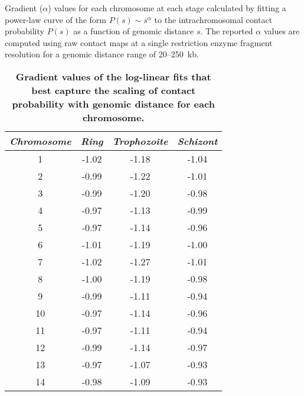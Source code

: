 \documentclass{article}
\begin{document}
\begin{table}
\caption{{\bf Gradient values of the log-linear fits that best capture the scaling of
    contact probability with genomic distance for each chromosome.}}
{ Gradient ($\alpha$) values for each chromosome at each stage calculated by fitting
    a power-law curve of the form $P(s) \sim s^\alpha$ to the intrachromosomal contact
    probability $P(s)$ as a function of genomic distance $s$. The reported $\alpha$
    values are computed using raw contact maps at a single restriction enzyme fragment
    resolution for a genomic distance range of 20--250~kb.
}
\vspace{10pt}
\begin{center}
\begin{tabular}{cccc}
\hline
\emph{Chromosome} & \emph{Ring} & \emph{Trophozoite} & \emph{Schizont} \\
\hline
1 & -1.02 & -1.18 & -1.04 \\
2 & -0.99 & -1.22 & -1.01 \\
3 & -0.99 & -1.20 & -0.98 \\
4 & -0.97 & -1.13 & -0.99 \\
5 & -0.97 & -1.14 & -0.96 \\
6 & -1.01 & -1.19 & -1.00 \\
7 & -1.02 & -1.27 & -1.01 \\
8 & -1.00 & -1.19 & -0.98 \\
9 & -0.99 & -1.11 & -0.94 \\
10 & -0.97 & -1.14 & -0.96 \\
11 & -0.97 & -1.11 & -0.94 \\
12 & -0.99 & -1.14 & -0.97 \\
13 & -0.97 & -1.07 & -0.93 \\
14 & -0.98 & -1.09 & -0.93 \\
\hline
\end{tabular}
\end{center}
\label{table:scalingFactors}
\end{table}
\clearpage
\end{document}
